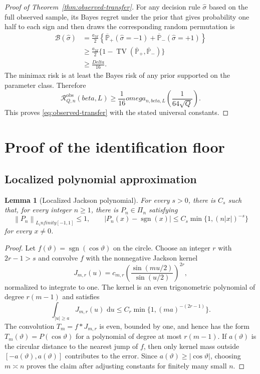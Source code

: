 \documentclass[11pt]{article}
\def\beta{beta}%
\def\omega{omega}%
\def\infty{infinity}%
\def\Delta{Delta}%
\newtheorem{lemma}[theorem]{Lemma}
\newcommand{\sgn}{\operatorname{sgn}}
\newcommand{\TV}{\operatorname{TV}}
\newcommand{\calR}{\mathcal R}
\newcommand{\norm}[1]{\left\lVert#1\right\rVert}
\newcommand{\dd}{\,\mathrm d}
\begin{document}
\begin{proof}[Proof of Theorem~\ref{thm:observed-transfer}]
For any decision rule $\widehat\sigma$ based on the full observed sample, its Bayes regret under the prior that gives probability one half to each sign and then draws the corresponding random permutation is
\begin{align*}
\mathcal B(\widehat\sigma)
&=
\frac{a_M}{2}
\left\{
\overline{\mathbb P}_+(\widehat\sigma=-1)
+
\overline{\mathbb P}_-(\widehat\sigma=+1)
\right\}\\
&\ge
\frac{a_M}{2}
\{1-\TV(\overline{\mathbb P}_+,\overline{\mathbb P}_-)\}\\
&\ge
\frac{\Delta}{16}.
\end{align*}
The minimax risk is at least the Bayes risk of any prior supported on the parameter class.  Therefore
\[
\calR^{\mathrm{obs}}_{Q,n}(\beta,L)
\ge
\frac1{16}\omega_{n,\beta,L}\!\left(\frac{1}{64\sqrt Q}\right).
\]
This proves \eqref{eq:observed-transfer} with the stated universal constants.
\end{proof}

\section{Proof of the identification floor}
\label{app:identification}

\subsection{Localized polynomial approximation}

\begin{lemma}[Localized Jackson polynomial]
\label{lem:jackson}
For every $s>0$, there is $C_s$ such that, for every integer $n\ge1$, there is $P_n\in\Pi_n$ satisfying
\[
\norm{P_n}_{L_\infty[-1,1]}\le1,
\qquad
|P_n(x)-\sgn(x)|
\le
C_s\min\{1,(n|x|)^{-s}\}
\]
for every $x\ne0$.
\end{lemma}

\begin{proof}
Let $f(\vartheta)=\sgn(\cos\vartheta)$ on the circle.  Choose an integer $r$ with $2r-1>s$ and convolve $f$ with the nonnegative Jackson kernel
\[
J_{m,r}(u)
=c_{m,r}
\left(\frac{\sin(mu/2)}{\sin(u/2)}\right)^{2r},
\]
normalized to integrate to one.  The kernel is an even trigonometric polynomial of degree $r(m-1)$ and satisfies
\[
\int_{|u|\ge a}J_{m,r}(u)\,\dd u
\le
C_r\min\{1,(ma)^{-(2r-1)}\}.
\]
The convolution $T_m=f*J_{m,r}$ is even, bounded by one, and hence has the form $T_m(\vartheta)=P(\cos\vartheta)$ for a polynomial of degree at most $r(m-1)$.  If $a(\vartheta)$ is the circular distance to the nearest jump of $f$, then only kernel mass outside $[-a(\vartheta),a(\vartheta)]$ contributes to the error.  Since $a(\vartheta)\ge|\cos\vartheta|$, choosing $m\asymp n$ proves the claim after adjusting constants for finitely many small $n$.
\end{proof}
\end{document}
